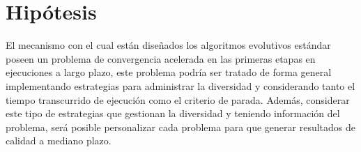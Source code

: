 \section{Hipótesis}
El mecanismo con el cual están diseñados los algoritmos evolutivos estándar poseen un problema de convergencia acelerada en las primeras etapas en ejecuciones a largo plazo, este problema podría ser tratado de forma general implementando estrategias para administrar la diversidad y considerando tanto el tiempo transcurrido de ejecución como el criterio de parada.
%
Además, considerar este tipo de estrategias que gestionan la diversidad y teniendo información del problema, será posible personalizar cada problema para que generar resultados de calidad a mediano plazo.